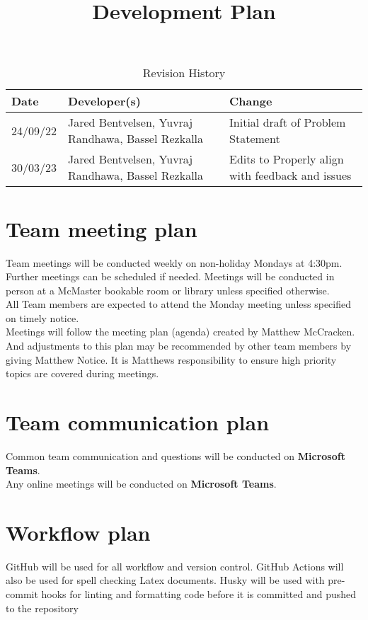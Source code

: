 \documentclass{article}
\title{Development Plan\\\progname}
\author{\authname}
\date{}
\begin{document}
	
	\maketitle
	
	\begin{table}[hp]
		\caption{Revision History} \label{TblRevisionHistory}
		\begin{tabularx}{\textwidth}{|X|X|X|}
			\toprule
			\textbf{Date} & \textbf{Developer(s)} & \textbf{Change}\\
			\midrule
			24/09/22 & Jared Bentvelsen, Yuvraj Randhawa, Bassel Rezkalla & Initial draft of Problem Statement\\
			\midrule
			30/03/23 & Jared Bentvelsen, Yuvraj Randhawa, Bassel Rezkalla & Edits to Properly align with feedback and issues\\
			\bottomrule
		\end{tabularx}
	\end{table}
	
	
	\section{Team meeting plan}
	Team meetings will be conducted weekly on non-holiday Mondays at 4:30pm.
	Further meetings can be scheduled if needed.
	Meetings will be conducted in person at a McMaster bookable room or library unless specified otherwise.\\
	All Team members are expected to attend the Monday meeting unless specified on timely notice.\\
	Meetings will follow the meeting plan (agenda) created by Matthew McCracken. And adjustments to this plan may be recommended by other team members by giving Matthew Notice. It is Matthews responsibility to ensure high priority topics are covered during meetings.
	
	\section{Team communication plan}
	Common team communication and questions will be conducted on \textbf{Microsoft Teams}.\\
	Any online meetings will be conducted on \textbf{Microsoft Teams}. \\
	
	\section{Workflow plan}
	GitHub will be used for all workflow and version control. GitHub Actions will also be used for spell checking Latex documents. Husky will be used with pre-commit hooks for linting and formatting code before it is committed and pushed to the repository
	
\end{document}
